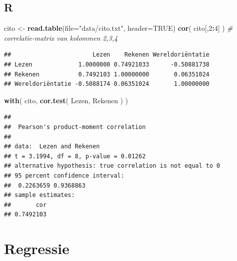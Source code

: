 \documentclass[
]{book}
\newenvironment{Shaded}{\begin{snugshade}}{\end{snugshade}}
\newcommand{\CommentTok}[1]{\textcolor[rgb]{0.56,0.35,0.01}{\textit{#1}}}
\newcommand{\DataTypeTok}[1]{\textcolor[rgb]{0.13,0.29,0.53}{#1}}
\newcommand{\DecValTok}[1]{\textcolor[rgb]{0.00,0.00,0.81}{#1}}
\newcommand{\KeywordTok}[1]{\textcolor[rgb]{0.13,0.29,0.53}{\textbf{#1}}}
\newcommand{\NormalTok}[1]{#1}
\newcommand{\OperatorTok}[1]{\textcolor[rgb]{0.81,0.36,0.00}{\textbf{#1}}}
\newcommand{\OtherTok}[1]{\textcolor[rgb]{0.56,0.35,0.01}{#1}}
\newcommand{\StringTok}[1]{\textcolor[rgb]{0.31,0.60,0.02}{#1}}
\begin{document}
\hypertarget{r-7}{%
\subsection{R}\label{r-7}}

\begin{Shaded}
\begin{Highlighting}[]
\NormalTok{cito \textless{}{-}}\StringTok{ }\KeywordTok{read.table}\NormalTok{(}\DataTypeTok{file=}\StringTok{"data/cito.txt"}\NormalTok{, }\DataTypeTok{header=}\OtherTok{TRUE}\NormalTok{)}
\KeywordTok{cor}\NormalTok{( cito[,}\DecValTok{2}\OperatorTok{:}\DecValTok{4}\NormalTok{] ) }\CommentTok{\# correlatie{-}matrix van kolommen 2,3,4}
\end{Highlighting}
\end{Shaded}

\begin{verbatim}
##                       Lezen    Rekenen Wereldoriëntatie
## Lezen             1.0000000 0.74921033      -0.50881738
## Rekenen           0.7492103 1.00000000       0.06351024
## Wereldoriëntatie -0.5088174 0.06351024       1.00000000
\end{verbatim}

\begin{Shaded}
\begin{Highlighting}[]
\KeywordTok{with}\NormalTok{( cito, }\KeywordTok{cor.test}\NormalTok{( Lezen, Rekenen ) )}
\end{Highlighting}
\end{Shaded}

\begin{verbatim}
## 
##  Pearson's product-moment correlation
## 
## data:  Lezen and Rekenen
## t = 3.1994, df = 8, p-value = 0.01262
## alternative hypothesis: true correlation is not equal to 0
## 95 percent confidence interval:
##  0.2263659 0.9368863
## sample estimates:
##       cor 
## 0.7492103
\end{verbatim}

\hypertarget{sec:regressie}{%
\section{Regressie}\label{sec:regressie}}
\end{document}
